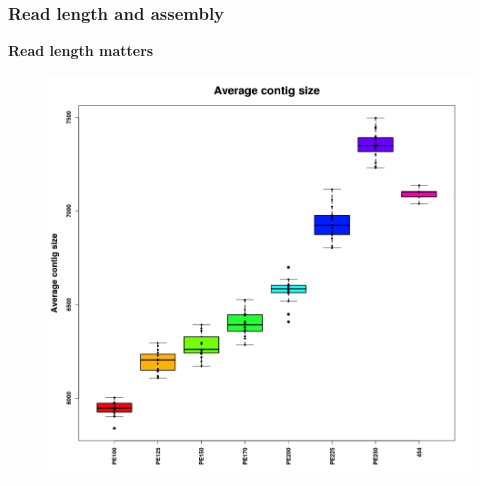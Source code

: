 \documentclass{beamer}
\begin{document}
\begin{frame}
\frametitle{Read length and assembly}
\textbf{Read length matters}

\begin{figure}[htbp]
\begin{center}
   \includegraphics[scale=0.5]{assembly.png}
\end{center}
\end{figure}

\end{frame}
\end{document}
